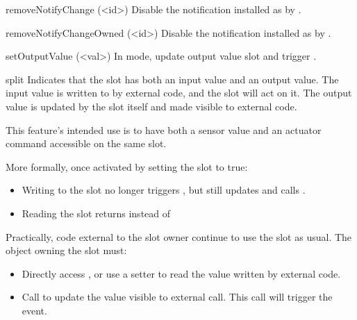 \begin{urbiscriptapi}
\item[removeNotifyChange](<id>)%
  Disable the notification installed as  by .


\item[removeNotifyChangeOwned](<id>)%
  Disable the notification installed as  by
  .

\item[setOutputValue](<val>)%
  In  mode, update output value slot  and
  trigger .

\item[split]%
  Indicates that the slot has both an input value and an output value.  The
  input value is written to by external code, and the slot will act on it.
  The output value is updated by the slot itself and made visible to
  external code.

  This feature's intended use is to have both a sensor value and an actuator
  command accessible on the same slot.

  More formally, once activated by setting the  slot to true:
\begin{itemize}
\item Writing to the slot no longer triggers , but still
  updates  and calls .
\item Reading the slot returns  instead of
\end{itemize}

Practically, code external to the slot owner continue to use the slot as
usual.  The object owning the slot must:
\begin{itemize}
\item Directly access , or use a setter to read the value
  written by external code.
\item Call  to update the value visible to external
  call.  This call will trigger the  event.
\end{itemize}


\end{urbiscriptapi}

